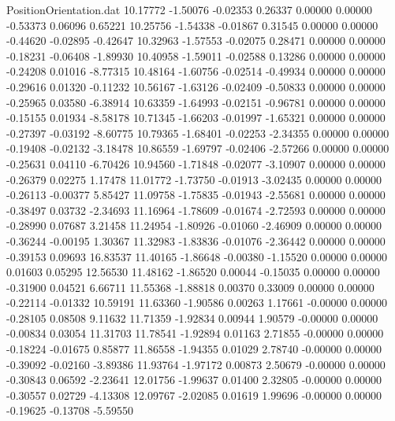 \begin{filecontents}{PositionOrientation.dat}
  10.17772   -1.50076   -0.02353     0.26337    0.00000    0.00000   -0.53373    0.06096    0.65221
  10.25756   -1.54338   -0.01867     0.31545    0.00000    0.00000   -0.44620   -0.02895   -0.42647
  10.32963   -1.57553   -0.02075     0.28471    0.00000    0.00000   -0.18231   -0.06408   -1.89930
  10.40958   -1.59011   -0.02588     0.13286    0.00000    0.00000   -0.24208    0.01016   -8.77315
  10.48164   -1.60756   -0.02514    -0.49934    0.00000    0.00000   -0.29616    0.01320   -0.11232
  10.56167   -1.63126   -0.02409    -0.50833    0.00000    0.00000   -0.25965    0.03580   -6.38914
  10.63359   -1.64993   -0.02151    -0.96781    0.00000    0.00000   -0.15155    0.01934   -8.58178
  10.71345   -1.66203   -0.01997    -1.65321    0.00000    0.00000   -0.27397   -0.03192   -8.60775
  10.79365   -1.68401   -0.02253    -2.34355    0.00000    0.00000   -0.19408   -0.02132   -3.18478
  10.86559   -1.69797   -0.02406    -2.57266    0.00000    0.00000   -0.25631    0.04110   -6.70426
  10.94560   -1.71848   -0.02077    -3.10907    0.00000    0.00000   -0.26379    0.02275    1.17478
  11.01772   -1.73750   -0.01913    -3.02435    0.00000    0.00000   -0.26113   -0.00377    5.85427
  11.09758   -1.75835   -0.01943    -2.55681    0.00000    0.00000   -0.38497    0.03732   -2.34693
  11.16964   -1.78609   -0.01674    -2.72593    0.00000    0.00000   -0.28990    0.07687    3.21458
  11.24954   -1.80926   -0.01060    -2.46909    0.00000    0.00000   -0.36244   -0.00195    1.30367
  11.32983   -1.83836   -0.01076    -2.36442    0.00000    0.00000   -0.39153    0.09693   16.83537
  11.40165   -1.86648   -0.00380    -1.15520    0.00000    0.00000    0.01603    0.05295   12.56530
  11.48162   -1.86520    0.00044    -0.15035    0.00000    0.00000   -0.31900    0.04521    6.66711
  11.55368   -1.88818    0.00370     0.33009    0.00000    0.00000   -0.22114   -0.01332   10.59191
  11.63360   -1.90586    0.00263     1.17661   -0.00000    0.00000   -0.28105    0.08508    9.11632
  11.71359   -1.92834    0.00944     1.90579   -0.00000    0.00000   -0.00834    0.03054   11.31703
  11.78541   -1.92894    0.01163     2.71855   -0.00000    0.00000   -0.18224   -0.01675    0.85877
  11.86558   -1.94355    0.01029     2.78740   -0.00000    0.00000   -0.39092   -0.02160   -3.89386
  11.93764   -1.97172    0.00873     2.50679   -0.00000    0.00000   -0.30843    0.06592   -2.23641
  12.01756   -1.99637    0.01400     2.32805   -0.00000    0.00000   -0.30557    0.02729   -4.13308
  12.09767   -2.02085    0.01619     1.99696   -0.00000    0.00000   -0.19625   -0.13708   -5.59550

\end{filecontents}
